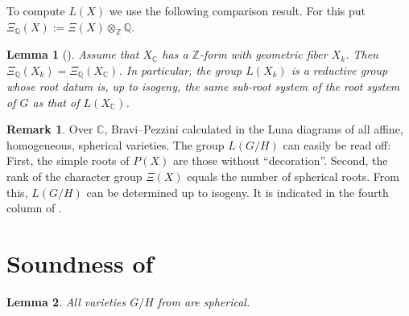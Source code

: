 \documentclass[12pt]{amsart}
\newcommand\BBC{{\mathbb C}}
\newcommand\BBQ{{\mathbb Q}}
\newcommand\BBZ{{\mathbb Z}}
\numberwithin{equation}{section}
\newtheorem{lemma}[lemma]{Lemma}
\theoremstyle{definition}
\newtheorem{remark}[remark]{Remark}
\begin{document}
To compute $L(X)$ we use the following comparison result. For this put
$\Xi_\BBQ(X):=\Xi(X)\otimes_\BBZ\BBQ$.

 \begin{lemma}[{\cite[Lem.~3.7]{Knop5}}]
   Assume that $X_\BBC$ has a $\BBZ$-form with geometric fiber $X_k$.  Then
   $\Xi_\BBQ(X_k)=\Xi_\BBQ(X_\BBC)$. In particular, the group $L(X_k)$
   is a reductive group whose root datum is, up to isogeny, the same
   sub-root system of the root system of $G$ as that of $L(X_\BBC)$.
 \end{lemma}

\begin{remark}
  Over $\BBC$, Bravi--Pezzini calculated in \cite{BrPezz} the Luna
  diagrams of all affine, homogeneous, spherical varieties. The group
  $L(G/H)$ can easily be read off: First, the simple roots of $P(X)$
  are those without ``decoration''. Second, the rank of the character
  group $\Xi(X)$ equals the number of spherical roots. From this,
  $L(G/H)$ can be determined up to isogeny. It is indicated in the
  fourth column of .
\end{remark}

\section{Soundness of }

\begin{lemma}
  \label{lem:known}
  All varieties $G/H$ from  are spherical.
\end{lemma}
\end{document}
